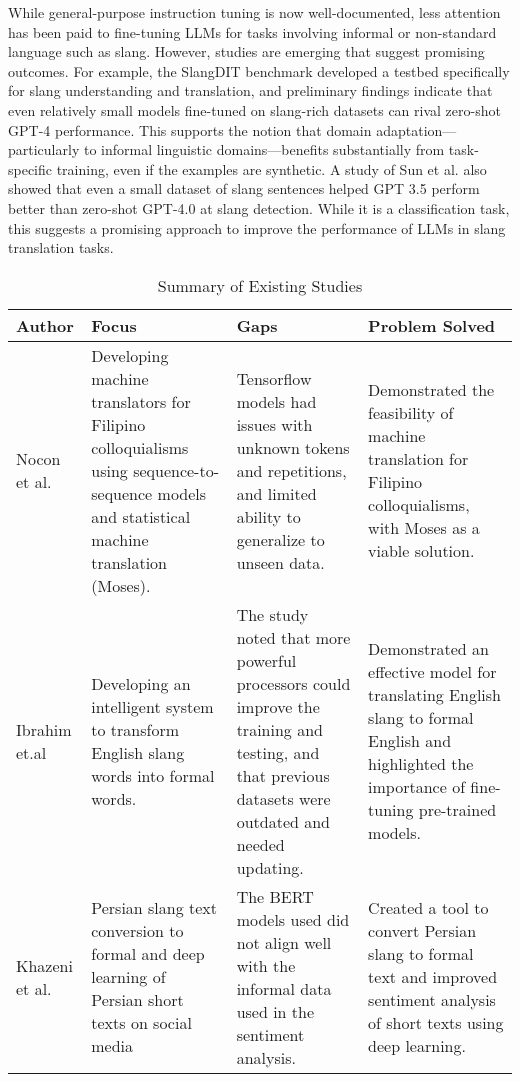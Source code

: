 While general-purpose instruction tuning is now well-documented, less attention has been paid to fine-tuning LLMs for tasks involving informal or non-standard language such as slang. However, studies are emerging that suggest promising outcomes. For example, the SlangDIT benchmark \cite{liang2025slangditbenchmarkingllmsinterpretative} developed a testbed specifically for slang understanding and translation, and preliminary findings indicate that even relatively small models fine-tuned on slang-rich datasets can rival zero-shot GPT-4 performance. This supports the notion that domain adaptation—particularly to informal linguistic domains—benefits substantially from task-specific training, even if the examples are synthetic. A study of Sun et al. \cite{sun2024informallanguageprocessingknowledge} also showed that even a small dataset of slang sentences helped GPT 3.5 perform better than zero-shot GPT-4.0 at slang detection. While it is a classification task, this suggests a promising approach to improve the performance of LLMs in slang translation tasks.

\begin{table}[ht]  
	\centering
	\caption{Summary of Existing Studies} \vspace{0.25em}
	\begin{tabular}{|p{1in}|p{1in}|p{1in} | p{1in}|} \hline
		\centering Author
		& Focus 
		& Gaps 
		& Problem Solved  \\ \hline
		
		Nocon et al.    
		& Developing machine translators for Filipino colloquialisms using sequence-to-sequence models and statistical machine translation (Moses). & Tensorflow models had issues with unknown tokens and repetitions, and limited ability to generalize to unseen data.
		& Demonstrated the feasibility of machine translation for Filipino colloquialisms, with Moses as a viable solution.
		\\ \hline
		
		Ibrahim et.al  
		& Developing an intelligent system to transform English slang words into formal words.
		& The study noted that more powerful processors could improve the training and testing, and that previous datasets were outdated and needed updating.
		& Demonstrated an effective model for translating English slang to formal English and highlighted the importance of fine-tuning pre-trained models.
		\\ \hline
		
		Khazeni et al.
		& Persian slang text conversion to formal and deep learning of Persian short texts on social media
		& The BERT models used did not align well with the informal data used in the sentiment analysis.
		& Created a tool to convert Persian slang to formal text and improved sentiment analysis of short texts using deep learning.
		\\ \hline
		
	\end{tabular}
	\label{tab:timetableactivities}
\end{table}

